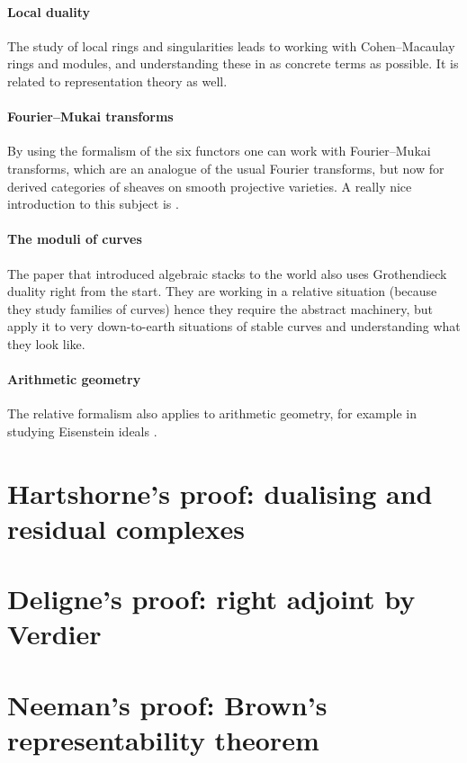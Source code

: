 \documentclass[10pt,a4paper]{article}
\begin{document}
\paragraph{Local duality}
The study of local rings and singularities leads to working with Cohen--Macaulay rings and modules, and understanding these in as concrete terms as possible. It is related to representation theory as well.

\paragraph{Fourier--Mukai transforms}
By using the formalism of the six functors one can work with Fourier--Mukai transforms, which are an analogue of the usual Fourier transforms, but now for derived categories of sheaves on smooth projective varieties. A really nice introduction to this subject is \cite{huybrechts-fourier-mukai}.

\paragraph{The moduli of curves}
The paper that introduced algebraic stacks to the world \cite{deligne-mumford-irreducibility-moduli-of-curves} also uses Grothendieck duality right from the start. They are working in a relative situation (because they study families of curves) hence they require the abstract machinery, but apply it to very down-to-earth situations of stable curves and understanding what they look like.

\paragraph{Arithmetic geometry}
The relative formalism also applies to arithmetic geometry, for example in studying Eisenstein ideals \cite{mazur-modular-curves-eisenstein-ideal}.


\section{Hartshorne's proof: dualising and residual complexes}

\section{Deligne's proof: right adjoint by Verdier}

\section{Neeman's proof: Brown's representability theorem}
\label{section:neeman}
\end{document}
